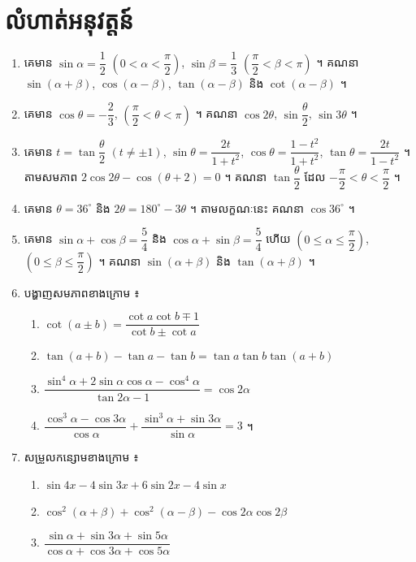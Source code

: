 \section*{លំហាត់អនុវត្តន៍}
\begin{enumerate}[1]
  \item គេមាន $\sin\alpha = \dfrac{1}{2}$ $\left(0 < \alpha < \dfrac{\pi}{2}\right)$, $\sin\beta = \dfrac{1}{3}$ $\left(\dfrac{\pi}{2} < \beta < \pi\right)$ ។ គណនា $\sin(\alpha + \beta)$, $\cos(\alpha - \beta)$, $\tan(\alpha - \beta)$ និង $\cot(\alpha - \beta)$ ។
  \item គេមាន $\cos\theta = -\dfrac{2}{3}$, $\left(\dfrac{\pi}{2} < \theta < \pi\right)$ ។ គណនា $\cos 2\theta$, $\sin\dfrac{\theta}{2}$, $\sin 3\theta$ ។
  \item គេមាន $t = \tan\dfrac{\theta}{2}$ $(t \ne \pm 1)$, $\sin\theta = \dfrac{2t}{1 + t^2}$, $\cos\theta = \dfrac{1 - t^2}{1 + t^2}$, $\tan\theta = \dfrac{2t}{1 - t^2}$ ។ តាមសមភាព $2\cos 2\theta - \cos(\theta + 2) = 0$ ។ គណនា $\tan\dfrac{\theta}{2}$ ដែល $-\dfrac{\pi}{2} < \theta < \dfrac{\pi}{2}$ ។
  \item គេមាន $\theta = 36^\circ$ និង $2\theta = 180^\circ - 3\theta$ ។ តាមលក្ខណៈនេះ គណនា $\cos 36^\circ$ ។
  \item គេមាន $\sin\alpha + \cos\beta = \dfrac{5}{4}$ និង $\cos\alpha + \sin\beta = \dfrac{5}{4}$ ហើយ $\left(0 \le \alpha \le \dfrac{\pi}{2}\right)$, $\left(0 \le \beta \le \dfrac{\pi}{2}\right)$ ។ គណនា $\sin(\alpha + \beta)$ និង $\tan(\alpha + \beta)$ ។
  \item បង្ហាញសមភាពខាងក្រោម ៖
  \begin{enumerate}[a]
    \item $\cot(a \pm b) = \dfrac{\cot a\cot b \mp 1}{\cot b \pm \cot a}$
    \item $\tan(a + b) - \tan a - \tan b = \tan a\tan b\tan(a + b)$
    \item $\dfrac{\sin^4\alpha + 2\sin\alpha\cos\alpha - \cos^4\alpha}{\tan 2\alpha - 1} = \cos 2\alpha$
    \item $\dfrac{\cos^3\alpha - \cos 3\alpha}{\cos\alpha} + \dfrac{\sin^3\alpha + \sin 3\alpha}{\sin\alpha} = 3$ ។
  \end{enumerate}
  \item សម្រួលកន្សោមខាងក្រោម ៖
  \begin{enumerate}[a]
    \item $\sin 4x - 4\sin 3x + 6\sin 2x - 4\sin x$
    \item $\cos^2(\alpha + \beta) + \cos^2(\alpha - \beta) - \cos 2\alpha\cos 2\beta$
    \item $\dfrac{\sin\alpha + \sin 3\alpha + \sin 5\alpha}{\cos\alpha + \cos 3\alpha + \cos 5\alpha}$

\end{enumerate}
\end{enumerate}
